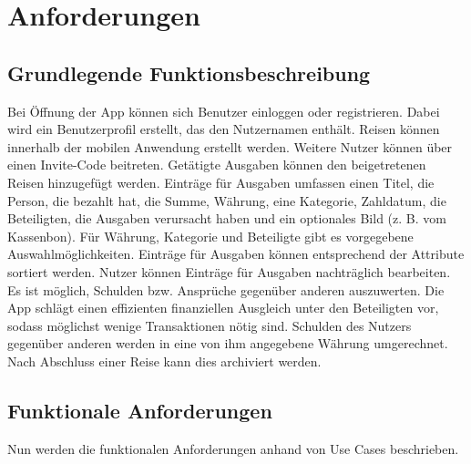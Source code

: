 \section{Anforderungen}

\subsection{Grundlegende Funktionsbeschreibung}

Bei Öffnung der App können sich Benutzer einloggen oder registrieren.
Dabei wird ein Benutzerprofil erstellt, das den Nutzernamen enthält.
Reisen können innerhalb der mobilen Anwendung erstellt werden.
Weitere Nutzer können über einen Invite-Code beitreten.
Getätigte Ausgaben können den beigetretenen Reisen hinzugefügt werden.
Einträge für Ausgaben umfassen einen Titel, die Person, die bezahlt hat, die Summe,
Währung, eine Kategorie, Zahldatum, die Beteiligten, die Ausgaben verursacht haben und ein optionales Bild (z. B. vom Kassenbon).
Für Währung, Kategorie und Beteiligte gibt es vorgegebene Auswahlmöglichkeiten.
Einträge für Ausgaben können entsprechend der Attribute sortiert werden.
Nutzer können Einträge für Ausgaben nachträglich bearbeiten.
Es ist möglich, Schulden bzw. Ansprüche gegenüber anderen auszuwerten.
Die App schlägt einen effizienten finanziellen Ausgleich unter den Beteiligten vor, sodass möglichst wenige Transaktionen nötig sind.
Schulden des Nutzers gegenüber anderen werden in eine von ihm angegebene Währung umgerechnet.
Nach Abschluss einer Reise kann dies archiviert werden.

\subsection{Funktionale Anforderungen}
Nun werden die funktionalen Anforderungen anhand von Use Cases beschrieben.


